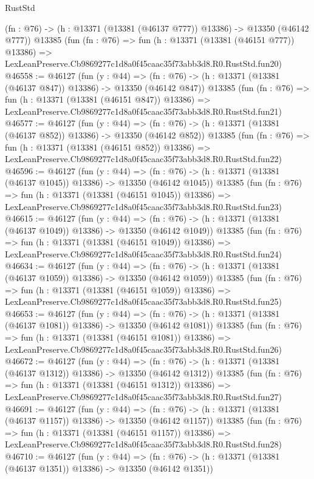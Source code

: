 \begin{lexlean}{RustStd}
\begin{coremodule}
    (fn : @76) -> (h : @13371 (@13381 (@46137 @777)) @13386) -> @13350 (@46142 @777))
    @13385
    (fun (fn : @76) =>
    fun (h : @13371 (@13381 (@46151 @777)) @13386) =>
    LexLeanPreserve.Cb9869277c1d8a0f45caac35f73abb3d8.R0.RustStd.fun20)
@46558 := @46127
    (fun (y : @44) =>
    (fn : @76) -> (h : @13371 (@13381 (@46137 @847)) @13386) -> @13350 (@46142 @847))
    @13385
    (fun (fn : @76) =>
    fun (h : @13371 (@13381 (@46151 @847)) @13386) =>
    LexLeanPreserve.Cb9869277c1d8a0f45caac35f73abb3d8.R0.RustStd.fun21)
@46577 := @46127
    (fun (y : @44) =>
    (fn : @76) -> (h : @13371 (@13381 (@46137 @852)) @13386) -> @13350 (@46142 @852))
    @13385
    (fun (fn : @76) =>
    fun (h : @13371 (@13381 (@46151 @852)) @13386) =>
    LexLeanPreserve.Cb9869277c1d8a0f45caac35f73abb3d8.R0.RustStd.fun22)
@46596 := @46127
    (fun (y : @44) =>
    (fn : @76) -> (h : @13371 (@13381 (@46137 @1045)) @13386) -> @13350 (@46142 @1045))
    @13385
    (fun (fn : @76) =>
    fun (h : @13371 (@13381 (@46151 @1045)) @13386) =>
    LexLeanPreserve.Cb9869277c1d8a0f45caac35f73abb3d8.R0.RustStd.fun23)
@46615 := @46127
    (fun (y : @44) =>
    (fn : @76) -> (h : @13371 (@13381 (@46137 @1049)) @13386) -> @13350 (@46142 @1049))
    @13385
    (fun (fn : @76) =>
    fun (h : @13371 (@13381 (@46151 @1049)) @13386) =>
    LexLeanPreserve.Cb9869277c1d8a0f45caac35f73abb3d8.R0.RustStd.fun24)
@46634 := @46127
    (fun (y : @44) =>
    (fn : @76) -> (h : @13371 (@13381 (@46137 @1059)) @13386) -> @13350 (@46142 @1059))
    @13385
    (fun (fn : @76) =>
    fun (h : @13371 (@13381 (@46151 @1059)) @13386) =>
    LexLeanPreserve.Cb9869277c1d8a0f45caac35f73abb3d8.R0.RustStd.fun25)
@46653 := @46127
    (fun (y : @44) =>
    (fn : @76) -> (h : @13371 (@13381 (@46137 @1081)) @13386) -> @13350 (@46142 @1081))
    @13385
    (fun (fn : @76) =>
    fun (h : @13371 (@13381 (@46151 @1081)) @13386) =>
    LexLeanPreserve.Cb9869277c1d8a0f45caac35f73abb3d8.R0.RustStd.fun26)
@46672 := @46127
    (fun (y : @44) =>
    (fn : @76) -> (h : @13371 (@13381 (@46137 @1312)) @13386) -> @13350 (@46142 @1312))
    @13385
    (fun (fn : @76) =>
    fun (h : @13371 (@13381 (@46151 @1312)) @13386) =>
    LexLeanPreserve.Cb9869277c1d8a0f45caac35f73abb3d8.R0.RustStd.fun27)
@46691 := @46127
    (fun (y : @44) =>
    (fn : @76) -> (h : @13371 (@13381 (@46137 @1157)) @13386) -> @13350 (@46142 @1157))
    @13385
    (fun (fn : @76) =>
    fun (h : @13371 (@13381 (@46151 @1157)) @13386) =>
    LexLeanPreserve.Cb9869277c1d8a0f45caac35f73abb3d8.R0.RustStd.fun28)
@46710 := @46127
    (fun (y : @44) =>
    (fn : @76) -> (h : @13371 (@13381 (@46137 @1351)) @13386) -> @13350 (@46142 @1351))

\end{coremodule}
\end{lexlean}
